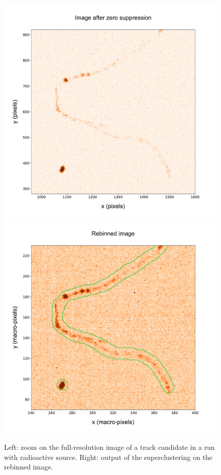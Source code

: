 \begin{figure}[ht]
  \begin{center}
     \includegraphics[width=0.49\linewidth]{figures/pic_run02317_ev8_oriIma_paper_zoom}
      \includegraphics[width=0.49\linewidth]{figures/pic_run02317_ev8_sc_3D_paper}
      \caption{Left: zoom on the full-resolution image of a
        track candidate in a run with \ambe radioactive
        source. Right: output of the superclustering on the rebinned
        image. \label{fig:super_clusters1}}
  \end{center}
\end{figure}
%
